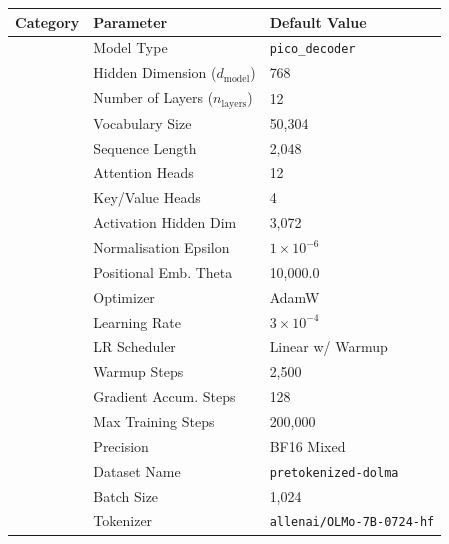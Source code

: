 \begin{table}[h!]
    \centering
    \renewcommand{\arraystretch}{1.2} %
    \setlength{\tabcolsep}{8pt} %
    \footnotesize
    \begin{tabular}{|>{\centering\arraybackslash}p{3cm}|p{5cm}|p{5.5cm}|}
        \hline
        \textbf{Category} & \textbf{Parameter} & \textbf{Default Value} \\
        \hline
        \multirow{10}{*}{\textbf{Model}}  
            & Model Type & \texttt{pico\_decoder} \\
            & Hidden Dimension ($d_{\text{model}}$) & 768 \\
            & Number of Layers ($n_{\text{layers}}$) & 12 \\
            & Vocabulary Size & 50,304 \\
            & Sequence Length & 2,048 \\
            & Attention Heads & 12 \\
            & Key/Value Heads & 4 \\
            & Activation Hidden Dim & 3,072 \\
            & Normalisation Epsilon & $1 \times 10^{-6}$ \\
            & Positional Emb. Theta & 10,000.0 \\
        \hline
        \multirow{7}{*}{\textbf{Training}}  
            & Optimizer & AdamW \\
            & Learning Rate & $3 \times 10^{-4}$ \\
            & LR Scheduler & Linear w/ Warmup \\
            & Warmup Steps & 2,500 \\
            & Gradient Accum. Steps & 128 \\
            & Max Training Steps & 200,000 \\
            & Precision & BF16 Mixed \\
        \hline
        \multirow{3}{*}{\textbf{Data}}  
            & Dataset Name & \texttt{pretokenized-dolma} \\
            & Batch Size & 1,024 \\
            & Tokenizer & \texttt{allenai/OLMo-7B-0724-hf} \\

\end{tabular}
\end{table}
